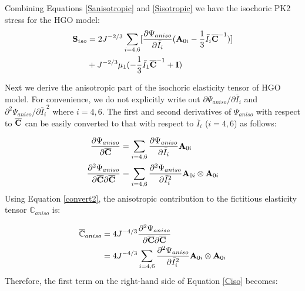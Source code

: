 Combining Equations \ref{Sanisotropic} and \ref{Sisotropic} we have the isochoric PK2 stress for the HGO model:
\begin{equation} \label{HGOSiso}
\begin{split}
\bold{S}_{iso} 
&= 
2J^{-2/3} \sum_{i = 4, 6}[\frac{\partial{\Psi_{aniso}}}{\partial{\bar{I}_i}}  (\bold{A}_{0i} - \frac{1}{3}\bar{I}_i\overline{\bold{C}}^{-1})] \\
&+  J^{-2/3}\mu_1(-\frac{1}{3}\bar{I}_1\overline{\bold{C}}^{-1} + \bold{I})
\end{split}
\end{equation}



Next we derive the anisotropic part of the isochoric elasticity tensor of HGO model. For convenience, we do not explicitly write out ${\partial\Psi_{aniso}}/{\partial{\bar{I}_i}}$ and $\partial^2{\Psi_{aniso}}/\partial{\bar{I}_i}^2$ where $i = 4, 6$. The first and second derivatives of $\Psi_{aniso}$ with respect to $\overline{\bold{C}}$ can be easily converted to that with respect to $\bar{I}_{i}$ ($i = 4, 6$) as follows:

\begin{subequations} \label{convert}
\begin{align}
\frac{\partial\Psi_{aniso}}{\partial\overline{\bold{C}}} 
&= \sum_{i = 4, 6}\frac{\partial\Psi_{aniso}}{\partial\bar{I}_i}\bold{A}_{0i} \label{convert1} \\
\frac{\partial^2\Psi_{aniso}}{\partial{\overline{\bold{C}}}\partial{\overline{\bold{C}}}} 
&= \sum_{i = 4, 6}\frac{\partial^2\Psi_{aniso}}{\partial{\bar{I}_i}^2}\bold{A}_{0i} \otimes \bold{A}_{0i} \label{convert2}
\end{align}
\end{subequations}
Using Equation \ref{convert2}, the anisotropic contribution to the fictitious elasticity tensor $\overline{\mathbb{C}}_{aniso}$ is:

\begin{equation}
\begin{split}
\overline{\mathbb{C}}_{aniso} 
&= 4J^{-4/3}\frac{\partial^2\Psi_{aniso}}{\partial\overline{\bold{C}}\partial\overline{\bold{C}}} \\
&= 4J^{-4/3}\sum_{i = 4, 6}\frac{\partial^2\Psi_{aniso}}{\partial{\bar{I}_i}^2}\bold{A}_{0i} \otimes \bold{A}_{0i}
\end{split}
\end{equation}
Therefore, the first term on the right-hand side of Equation \ref{Ciso} becomes:

